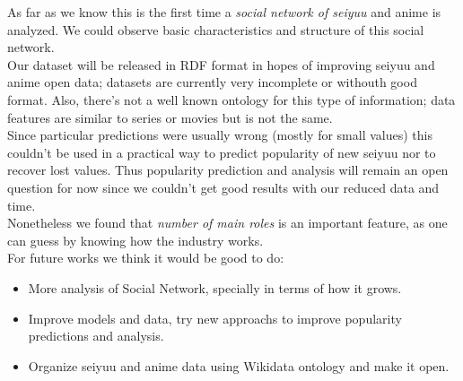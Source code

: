 As far as we know this is the first time a \textit{social network of seiyuu} and anime is analyzed. We could observe basic characteristics and structure of this social network. \\

Our dataset will be released in RDF format in hopes of improving seiyuu and anime open data; datasets are currently very incomplete or withouth good format. Also, there's not a well known ontology for this type of information; data features are similar to series or movies but is not the same.\\

Since particular predictions were usually wrong (mostly for small values) this couldn't be used in a practical way to predict popularity of new seiyuu nor to recover lost values. Thus popularity prediction and analysis will remain an open question for now since we couldn't get good results with our reduced data and time.\\

Nonetheless we found that \textit{number of main roles} is an important feature, as one can guess by knowing how the industry works.\\

For future works we think it would be good to do:
\begin{itemize}
\item More analysis of Social Network, specially in terms of how it grows.
\item Improve models and data, try new approachs to improve popularity predictions and analysis.
\item Organize seiyuu and anime data using Wikidata ontology and make it open.
\end{itemize}
